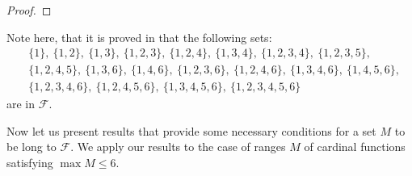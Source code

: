 \documentclass{amsart}
\theoremstyle{definition}
\begin{document}
\begin{proof}
\end{proof}


Note here, that it is proved in \cite{cardfun} that the following sets: 
\begin{align*}
& \{1\},\ \{1,2\},\ \{1,3\},\  \{1,2,3\},\ \{1,2,4\},\ \{1,3,4\},\ \{1,2,3,4\},\ \{1,2,3,5\},\\ & 
\{1,2,4,5\},\ \{1,3,6\},\ \{1,4,6\},\ \{1,2,3,6\},\ \{1,2,4,6\},\ \{1,3,4,6\},\ \{1,4,5,6\}, \\
& \{1,2,3,4,6\},\ \{1,2,4,5,6\},\ \{1,3,4,5,6\},\ \{1,2,3,4,5,6\}
\end{align*}
are in $\mathcal{F}$.

Now let us present results that provide some necessary conditions for a set $M$ to be long to $\mathcal{F}$. We apply our results to the case of ranges $M$ of cardinal functions satisfying $\max M\leq 6$. 
\end{document}
